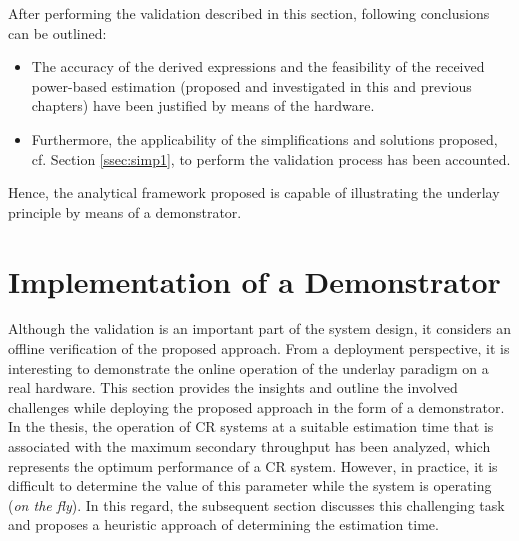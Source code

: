 After performing the validation described in this section, following conclusions can be outlined: 
\begin{itemize}
\item The accuracy of the derived expressions and the feasibility of the received power-based estimation (proposed and investigated in this and previous chapters) have been justified by means of the hardware.
\item Furthermore, the applicability of the simplifications and solutions proposed, cf. Section \ref{ssec:simp1}, to perform the validation process has been accounted.    
\end{itemize}
Hence, the analytical framework proposed is capable of illustrating the underlay principle by means of a demonstrator.

\section{Implementation of a Demonstrator}
\label{sec:demo}
Although the validation is an important part of the system design, it considers an offline verification of the proposed approach. From a deployment perspective, it is interesting to demonstrate the online operation of the underlay paradigm on a real hardware. This section provides the insights and outline the involved challenges while deploying the proposed approach in the form of a demonstrator. In the thesis, the operation of CR systems at a suitable estimation time that is associated with the maximum secondary throughput has been analyzed, which represents the optimum performance of a CR system. However, in practice, it is difficult to determine the value of this parameter while the system is operating (\textit{on the fly}). In this regard, the subsequent section discusses this challenging task and proposes a heuristic approach of determining the estimation time. 

